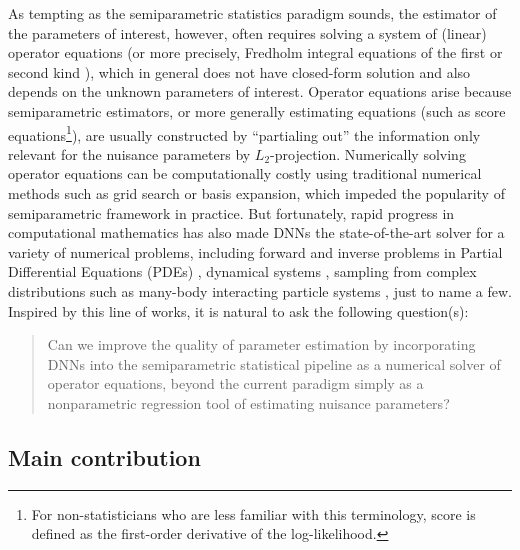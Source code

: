 \documentclass[11pt]{article}
\begin{document}
As tempting as the semiparametric statistics paradigm sounds, the estimator of the parameters of interest, however, often requires solving a system of (linear) operator equations (or more precisely, Fredholm integral equations of the first or second kind \citep{kress2013linear}), which in general does not have closed-form solution \citep{robins1994estimation, scharfstein1999adjusting, robins2004estimation, matsouaka2017instrumental, zhang2019semiparametric, liu2021efficient, zhao2021versatile, yang2021semiparametric} and also depends on the unknown parameters of interest. Operator equations arise because semiparametric estimators, or more generally estimating equations (such as score equations\footnote{For non-statisticians who are less familiar with this terminology, score is defined as the first-order derivative of the log-likelihood.}), are usually constructed by ``partialing out'' the information only relevant for the nuisance parameters by $L_{2}$-projection. Numerically solving operator equations can be computationally costly using traditional numerical methods such as grid search or basis expansion, which impeded the popularity of semiparametric framework in practice. But fortunately, rapid progress in computational mathematics has also made DNNs the state-of-the-art solver for a variety of numerical problems, including forward and inverse problems in Partial Differential Equations (PDEs) \citep{e2018deep, yang2019adversarial, li2020multi, raissi2019physics, psaros2023uncertainty, lu2021learning, lu2022machine}, dynamical systems \citep{mardt2018vampnets, lu2021deepxde, yang2020physics, guo2022normalizing}, sampling from complex distributions such as many-body interacting particle systems \citep{noe2019boltzmann, wu2020stochastic}, just to name a few. Inspired by this line of works, it is natural to ask the following question(s):
\begin{quote}
    Can we improve the quality of parameter estimation by incorporating DNNs into the semiparametric statistical pipeline as a numerical solver of operator equations, beyond the current paradigm simply as a nonparametric regression tool of estimating nuisance parameters?
\end{quote}

\subsection*{Main contribution}
\end{document}
